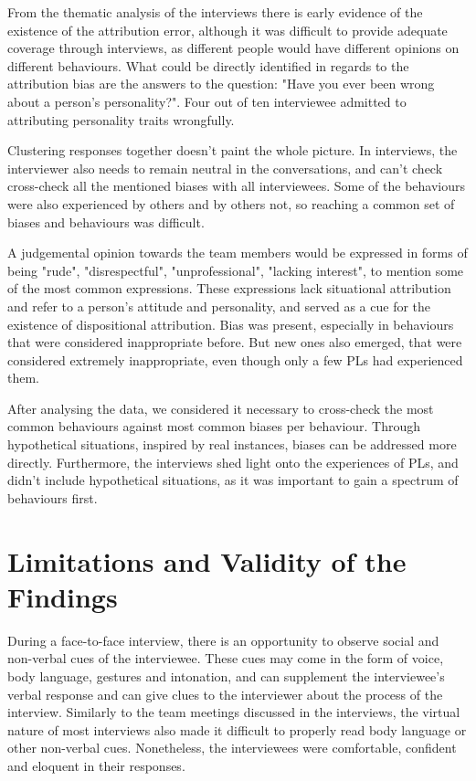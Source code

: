 From the thematic analysis of the interviews there is early evidence of the existence of the attribution error, although it was difficult to provide adequate coverage through interviews, as different people would have different opinions on different behaviours. What could be directly identified in regards to the attribution bias are the answers to the question: "Have you ever been wrong about a person's personality?". Four out of ten interviewee admitted to attributing personality traits wrongfully. 

Clustering responses together doesn't paint the whole picture. In interviews, the interviewer also needs to remain neutral in the conversations, and can't check cross-check all the mentioned biases with all interviewees. Some of the behaviours were also experienced by others and by others not, so reaching a common set of biases and behaviours was difficult. 

A judgemental opinion towards the team members would be expressed in forms of being "rude", "disrespectful", "unprofessional", "lacking interest", to mention some of the most common expressions. These expressions lack situational attribution and refer to a person's attitude and personality, and served as a cue for the existence of dispositional attribution. Bias was present, especially in behaviours that were considered inappropriate before. But new ones also emerged, that were considered extremely inappropriate, even though only a few PLs had experienced them. 

After analysing the data, we considered it necessary to cross-check the most common behaviours against most common biases per behaviour. Through hypothetical situations, inspired by real instances, biases can be addressed more directly. Furthermore, the interviews shed light onto the experiences of PLs, and didn't include hypothetical situations, as it was important to gain a spectrum of behaviours first.

\section{Limitations and Validity of the Findings}\label{Limitations}

During a face-to-face interview, there is an opportunity to observe social and non-verbal cues of the interviewee. These cues may come in the form of voice, body language, gestures and intonation, and can supplement the interviewee’s verbal response and can give clues to the interviewer about the process of the interview. Similarly to the team meetings discussed in the interviews, the virtual nature of most interviews also made it difficult to properly read body language or other non-verbal cues. Nonetheless, the interviewees were comfortable, confident and eloquent in their responses. 

